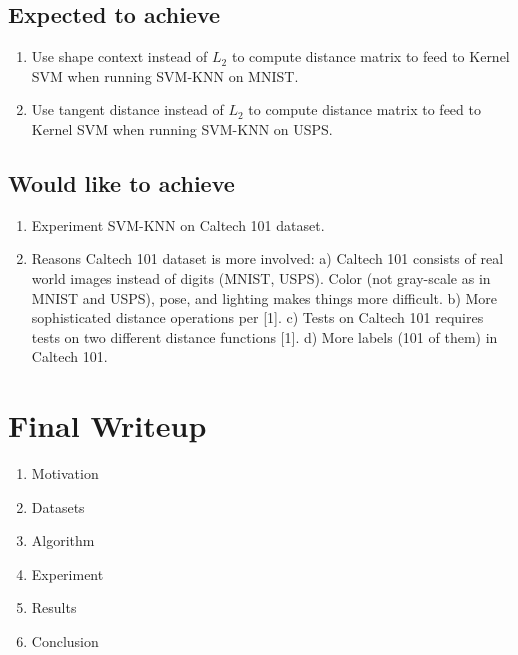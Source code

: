 \documentclass[11pt]{article}
\begin{document}
\subsection{Expected to achieve}
\begin{enumerate}[(1)]
\item Use shape context instead of $L_2$ to compute distance matrix to feed to Kernel SVM when running SVM-KNN on MNIST.
\item Use tangent distance instead of $L_2$  to compute distance matrix to feed to Kernel SVM when running SVM-KNN on USPS.
\end{enumerate}

\subsection{Would like to achieve}
\begin{enumerate}[(1)]
\item Experiment SVM-KNN on Caltech 101 dataset.
\item Reasons Caltech 101 dataset is more involved:
\subitem a) Caltech 101 consists of real world images instead of digits (MNIST, USPS). Color
\subitem      (not gray-scale as in MNIST and USPS), pose, and lighting makes things more difficult.
\subitem b) More sophisticated distance operations per [1].
\subitem c) Tests on Caltech 101 requires tests on two different distance functions [1].
\subitem d) More labels (101 of them) in Caltech 101.
\end{enumerate}

\section{Final Writeup}

\begin{enumerate}[(1)]
\item Motivation
\item Datasets
\item Algorithm
\item Experiment
\item Results
\item Conclusion
\end{enumerate}
\end{document}
